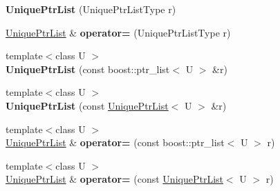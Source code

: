 \begin{DoxyCompactItemize}
\item 
\hypertarget{classcore_1_1container_1_1_unique_ptr_list_ac844d212c30010b621b7a871af75efd2}{{\bfseries Unique\-Ptr\-List} (Unique\-Ptr\-List\-Type r)}\label{classcore_1_1container_1_1_unique_ptr_list_ac844d212c30010b621b7a871af75efd2}

\item 
\hypertarget{classcore_1_1container_1_1_unique_ptr_list_a233d8457e23875f15ecad48085a0a9bc}{\hyperlink{classcore_1_1container_1_1_unique_ptr_list}{Unique\-Ptr\-List} \& {\bfseries operator=} (Unique\-Ptr\-List\-Type r)}\label{classcore_1_1container_1_1_unique_ptr_list_a233d8457e23875f15ecad48085a0a9bc}

\item 
\hypertarget{classcore_1_1container_1_1_unique_ptr_list_a99a9b15b5a32297d8937e64cd70990cb}{{\footnotesize template$<$class U $>$ }\\{\bfseries Unique\-Ptr\-List} (const boost\-::ptr\-\_\-list$<$ U $>$ \&r)}\label{classcore_1_1container_1_1_unique_ptr_list_a99a9b15b5a32297d8937e64cd70990cb}

\item 
\hypertarget{classcore_1_1container_1_1_unique_ptr_list_ad50e0c10e96dcca732f640d0e4f48690}{{\footnotesize template$<$class U $>$ }\\{\bfseries Unique\-Ptr\-List} (const \hyperlink{classcore_1_1container_1_1_unique_ptr_list}{Unique\-Ptr\-List}$<$ U $>$ \&r)}\label{classcore_1_1container_1_1_unique_ptr_list_ad50e0c10e96dcca732f640d0e4f48690}

\item 
\hypertarget{classcore_1_1container_1_1_unique_ptr_list_a7911dc4e78aa037fc6758b47b2f8346b}{{\footnotesize template$<$class U $>$ }\\\hyperlink{classcore_1_1container_1_1_unique_ptr_list}{Unique\-Ptr\-List} \& {\bfseries operator=} (const boost\-::ptr\-\_\-list$<$ U $>$ r)}\label{classcore_1_1container_1_1_unique_ptr_list_a7911dc4e78aa037fc6758b47b2f8346b}

\item 
\hypertarget{classcore_1_1container_1_1_unique_ptr_list_a73521d6e68619d8809838e5b05cd8e3b}{{\footnotesize template$<$class U $>$ }\\\hyperlink{classcore_1_1container_1_1_unique_ptr_list}{Unique\-Ptr\-List} \& {\bfseries operator=} (const \hyperlink{classcore_1_1container_1_1_unique_ptr_list}{Unique\-Ptr\-List}$<$ U $>$ r)}\label{classcore_1_1container_1_1_unique_ptr_list_a73521d6e68619d8809838e5b05cd8e3b}


\end{DoxyCompactItemize}
